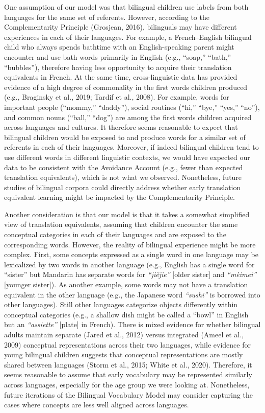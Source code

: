 \documentclass[
  english,
  ,man,floatsintext]{apa6}
\begin{document}
One assumption of our model was that bilingual children use labels from both languages for the same set of referents. However, according to the Complementarity Principle (Grosjean, 2016), bilinguals may have different experiences in each of their languages. For example, a French--English bilingual child who always spends bathtime with an English-speaking parent might encounter and use bath words primarily in English (e.g., ``soap,'' ``bath,'' ``bubbles''), therefore having less opportunity to acquire their translation equivalents in French. At the same time, cross-linguistic data has provided evidence of a high degree of commonality in the first words children produced (e.g., Braginsky et al., 2019; Tardif et al., 2008). For example, words for important people (``mommy,'' ``daddy''), social routines (``hi,'' ``bye,'' ``yes,'' ``no''), and common nouns (``ball,'' ``dog'') are among the first words children acquired across languages and cultures. It therefore seems reasonable to expect that bilingual children would be exposed to and produce words for a similar set of referents in each of their languages. Moreover, if indeed bilingual children tend to use different words in different linguistic contexts, we would have expected our data to be consistent with the Avoidance Account (e.g., fewer than expected translation equivalents), which is not what we observed. Nonetheless, future studies of bilingual corpora could directly address whether early translation equivalent learning might be impacted by the Complementarity Principle.

Another consideration is that our model is that it takes a somewhat simplified view of translation equivalents, assuming that children encounter the same conceptual categories in each of their languages and are exposed to the corresponding words. However, the reality of bilingual experience might be more complex. First, some concepts expressed as a single word in one language may be lexicalized by two words in another language (e.g., English has a single word for ``sister'' but Mandarin has separate words for \emph{``jiějie''} {[}older sister{]} and \emph{``mèimei''} {[}younger sister{]}). As another example, some words may not have a translation equivalent in the other language (e.g., the Japanese word \emph{``sushi''} is borrowed into other languages). Still other languages categorize objects differently within conceptual categories (e.g., a shallow dish might be called a ``bowl'' in English but an \emph{``assiette''} {[}plate{]} in French). There is mixed evidence for whether bilingual adults maintain separate (Jared et al., 2012) versus integrated (Ameel et al., 2009) conceptual representations across their two languages, while evidence for young bilingual children suggests that conceptual representations are mostly shared between languages (Storm et al., 2015; White et al., 2020). Therefore, it seems reasonable to assume that early vocabulary may be represented similarly across languages, especially for the age group we were looking at. Nonetheless, future iterations of the Bilingual Vocabulary Model may consider capturing the cases where concepts are less well aligned across languages.
\end{document}
